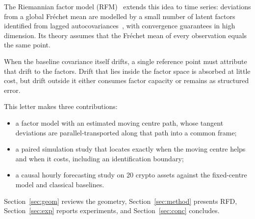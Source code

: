 \documentclass[journal]{IEEEtran}
\begin{document}
The Riemannian factor model (RFM)~\cite{huang2026rfm} extends this idea to
time series: deviations from a global Fr\'echet mean are modelled by a
small number of latent factors identified from lagged
autocovariances~\cite{lamyao2012}, with convergence guarantees in high
dimension. Its theory assumes that the Fr\'echet mean of every observation
equals the same point.

When the baseline covariance itself drifts, a single reference point must
attribute that drift to the factors. Drift that lies inside the factor
space is absorbed at little cost, but drift outside it either consumes
factor capacity or remains as structured error.

This letter makes three contributions:
\begin{itemize}
\item a factor model with an estimated moving centre path, whose tangent
deviations are parallel-transported along that path into a common frame;
\item a paired simulation study that locates exactly when the moving centre
helps and when it costs, including an identification boundary;
\item a causal hourly forecasting study on 20 crypto assets against the
fixed-centre model and classical baselines.
\end{itemize}

Section~\ref{sec:geom} reviews the geometry, Section~\ref{sec:method}
presents RFD, Section~\ref{sec:exp} reports experiments, and
Section~\ref{sec:conc} concludes.

\end{document}
